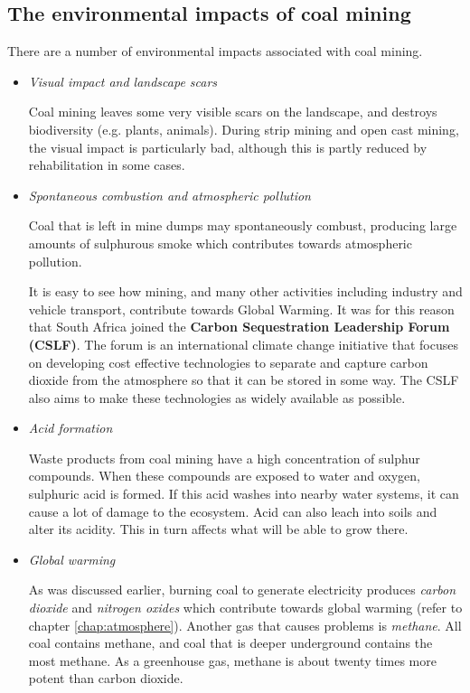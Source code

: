 \subsection{The environmental impacts of coal mining}

There are a number of environmental impacts associated with coal mining.

\begin{itemize}
\item{\textit{Visual impact and landscape scars}

Coal mining leaves some very visible scars on the landscape, and destroys biodiversity (e.g. plants, animals). During strip mining and open cast mining, the visual impact is particularly bad, although this is partly reduced by rehabilitation in some cases.
}

\item{\textit{Spontaneous combustion and atmospheric pollution}

Coal that is left in mine dumps may spontaneously combust, producing large amounts of sulphurous smoke which contributes towards atmospheric pollution.}

\begin{IFact}{It is easy to see how mining, and many other activities including industry and vehicle transport, contribute towards Global Warming. It was for this reason that South Africa joined the \textbf{Carbon Sequestration Leadership Forum (CSLF)}. The forum is an international climate change initiative that focuses on developing cost effective technologies to separate and capture carbon dioxide from the atmosphere so that it can be stored in some way. The CSLF also aims to make these technologies as widely available as possible.
}
\end{IFact}

\item{\textit{Acid formation}

Waste products from coal mining have a high concentration of sulphur compounds. When these compounds are exposed to water and oxygen, sulphuric acid is formed. If this acid washes into nearby water systems, it can cause a lot of damage to the ecosystem. Acid can also leach into soils and alter its acidity. This in turn affects what will be able to grow there.
}

\item{\textit{Global warming}

As was discussed earlier, burning coal to generate electricity produces \textit{carbon dioxide} and \textit{nitrogen oxides} which contribute towards global warming (refer to chapter \ref{chap:atmosphere}). Another gas that causes problems is \textit{methane}. All coal contains methane, and coal that is deeper underground contains the most methane. As a greenhouse gas, methane is about twenty times more potent than carbon dioxide.
}
\end{itemize}
